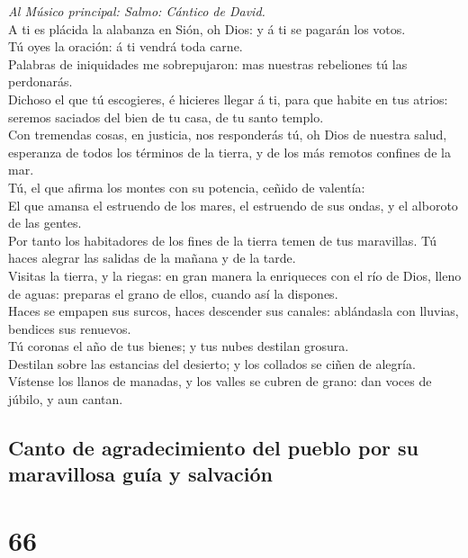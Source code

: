  \emph{Al Músico principal: Salmo: Cántico de David.}\\
A ti es plácida la alabanza en Sión, oh Dios: y á ti se pagarán los
votos.\\
 Tú oyes la oración: á ti vendrá toda carne.\\
 Palabras de iniquidades me sobrepujaron: mas nuestras
rebeliones tú las perdonarás.\\
 Dichoso el que tú escogieres, é hicieres llegar á ti, para
que habite en tus atrios: seremos saciados del bien de tu casa, de tu
santo templo.\\
 Con tremendas cosas, en justicia, nos responderás tú, oh
Dios de nuestra salud, esperanza de todos los términos de la tierra, y
de los más remotos confines de la mar.\\
 Tú, el que afirma los montes con su potencia, ceñido de
valentía:\\
 El que amansa el estruendo de los mares, el estruendo de
sus ondas, y el alboroto de las gentes.\\
 Por tanto los habitadores de los fines de la tierra temen
de tus maravillas. Tú haces alegrar las salidas de la mañana y de la
tarde.\\
 Visitas la tierra, y la riegas: en gran manera la
enriqueces con el río de Dios, lleno de aguas: preparas el grano de
ellos, cuando así la dispones.\\
 Haces se empapen sus surcos, haces descender sus canales:
ablándasla con lluvias, bendices sus renuevos.\\
 Tú coronas el año de tus bienes; y tus nubes destilan
grosura.\\
 Destilan sobre las estancias del desierto; y los collados
se ciñen de alegría.\\
 Vístense los llanos de manadas, y los valles se cubren de
grano: dan voces de júbilo, y aun cantan.

\hypertarget{canto-de-agradecimiento-del-pueblo-por-su-maravillosa-guuxeda-y-salvaciuxf3n}{%
\subsection{Canto de agradecimiento del pueblo por su maravillosa guía y
salvación}\label{canto-de-agradecimiento-del-pueblo-por-su-maravillosa-guuxeda-y-salvaciuxf3n}}

\hypertarget{section-65}{%
\section{66}\label{section-65}}

